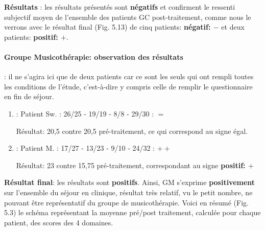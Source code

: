    
   \textbf{ Résultats }: les résultats présentés sont  \textbf{négatifs} 
   et confirment le ressenti subjectif moyen de l'ensemble des patients
   GC post-traitement,  comme nous le verrons avec  le résultat final  (Fig. 5.13) de
   cinq patients:  \textbf{négatif:  $-$} et deux patients:  \textbf{positif:  $+$}.
   
\paragraph {Groupe Musicothérapie: observation des résultats}
: il ne s'agira ici que de  deux patients car ce sont les seuls qui ont rempli toutes les conditions de 
l'étude, 
 c'est-à-dire y compris celle de remplir le questionnaire en fin de séjour.
 
 \begin{enumerate}
 	\item :  Patient Sw. : 26/25 - 19/19 - 8/8 - 29/30 :   $=$
 	
 	
 	
 	Résultat: 20,5 contre 20,5 pré-traitement, ce qui
 	correspond au signe égal.
 	
 	
 	
 	\item : Patient M. : 17/27 - 13/23 -  9/10 - 24/32 :  $++$
 	
 	Résultat: 23 contre 15,75 pré-traitement, correspondant
 	au signe \textbf{positif: $+$}
 \end{enumerate}
 \textbf{ Résultat final}: les résultats sont \textbf{positifs}.
 Ainsi,  GM s'exprime
 \textbf{positivement}
 sur l'ensemble du séjour en clinique, résultat très relatif, vu le petit nombre, ne pouvant être  
 représentatif du 
 groupe de 
 musicothérapie.
 Voici en résumé (Fig. 5.3) le schéma représentant la moyenne pré/post traitement, calculée pour chaque 
 patient, des scores des 4 domaines.
 
